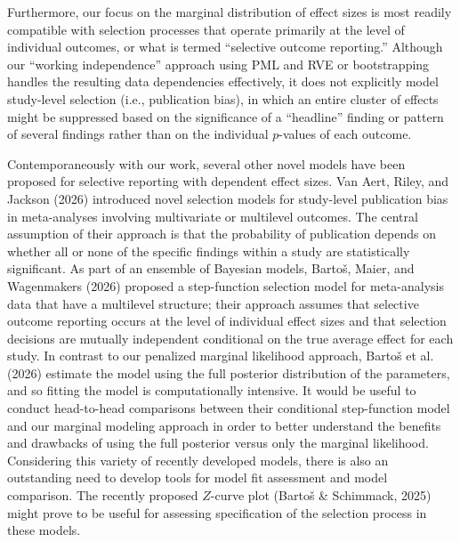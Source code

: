 \documentclass[
  american,
  man, donotrepeattitle,floatsintext]{apa7}
\begin{document}
Furthermore, our focus on the marginal distribution of effect sizes is most readily compatible with selection processes that operate primarily at the level of individual outcomes, or what is termed ``selective outcome reporting.'' Although our ``working independence'' approach using PML and RVE or bootstrapping handles the resulting data dependencies effectively, it does not explicitly model study-level selection (i.e., publication bias), in which an entire cluster of effects might be suppressed based on the significance of a ``headline'' finding or pattern of several findings rather than on the individual \(p\)-values of each outcome.

Contemporaneously with our work, several other novel models have been proposed for selective reporting with dependent effect sizes.
Van Aert, Riley, and Jackson (2026) introduced novel selection models for study-level publication bias in meta-analyses involving multivariate or multilevel outcomes. The central assumption of their approach is that the probability of publication depends on whether all or none of the specific findings within a study are statistically significant.
As part of an ensemble of Bayesian models, Bartoš, Maier, and Wagenmakers (2026) proposed a step-function selection model for meta-analysis data that have a multilevel structure;
their approach assumes that selective outcome reporting occurs at the level of individual effect sizes and that selection decisions are mutually independent conditional on the true average effect for each study.
In contrast to our penalized marginal likelihood approach, Bartoš et al. (2026) estimate the model using the full posterior distribution of the parameters, and so fitting the model is computationally intensive.
It would be useful to conduct head-to-head comparisons between their conditional step-function model and our marginal modeling approach in order to better understand the benefits and drawbacks of using the full posterior versus only the marginal likelihood.
Considering this variety of recently developed models, there is also an outstanding need to develop tools for model fit assessment and model comparison.
The recently proposed \(Z\)-curve plot (Bartoš \& Schimmack, 2025) might prove to be useful for assessing specification of the selection process in these models.
\end{document}
